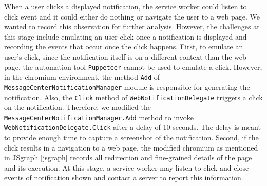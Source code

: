\textbf{}
When a user clicks a displayed notification, the service worker could listen to click event and it could either do nothing or navigate the user to a web page. We wanted to record this observation for further analysis. However, the challenges at this stage include emulating an user click once a notification is displayed and recording the events that occur once the click happens. First, to emulate an user's click, since the notification itself is on a different context than the web page, the automation tool \texttt{Puppeteer} cannot be used to emulate a click. However, in the chromium environment, the method \texttt{Add} of \texttt{MessageCenterNotificationManager} module is responsible for generating the notification. Also, the \texttt{Click} method of \texttt{WebNotificationDelegate} triggers a click on the notification. Therefore, we modified the \texttt{MessageCenterNotificationManager.Add} method to invoke \texttt{WebNotificationDelegate.Click} after a delay of 10 seconds. The delay is meant to provide enough time to capture a screenshot of the notification. Second, if the click results in a navigation to a web page, the modified chromium as mentioned in JSgraph \ref{jsgraph} records all redirection and fine-grained details of the page and its execution. At this stage, a service worker may listen to click and close events of notification shown and contact a server to report this information.


